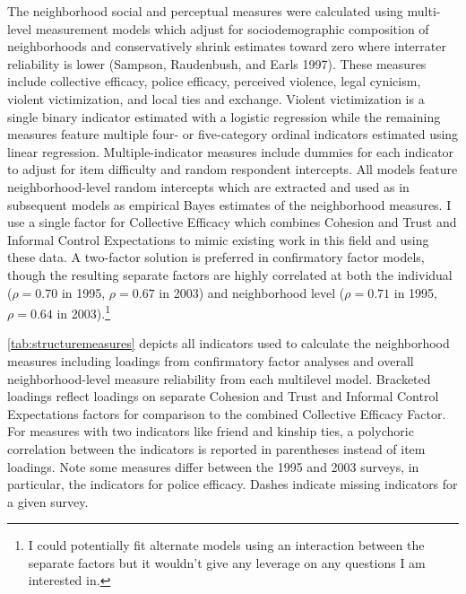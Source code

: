 \documentclass [11pt, proquest] {uwthesis}[2015/03/03]
\begin{document}
The neighborhood social and perceptual measures were calculated using multi-level measurement models which adjust for sociodemographic composition of neighborhoods and conservatively shrink estimates toward zero where interrater reliability is lower (Sampson, Raudenbush, and Earls 1997). These measures include collective efficacy, police efficacy, perceived violence, legal cynicism, violent victimization, and local ties and exchange. Violent victimization is a single binary indicator estimated with a logistic regression while the remaining measures feature multiple four- or five-category ordinal indicators estimated using linear regression. Multiple-indicator measures include dummies for each indicator to adjust for item difficulty and random respondent intercepts. All models feature neighborhood-level random intercepts which are extracted and used as in subsequent models as empirical Bayes estimates of the neighborhood measures. I use a single factor for Collective Efficacy which combines Cohesion and Trust and Informal Control Expectations to mimic existing work in this field and using these data. A two-factor solution is preferred in confirmatory factor models, though the resulting separate factors are highly correlated at both the individual (\(\rho=0.70\) in 1995, \(\rho=0.67\) in 2003) and neighborhood level (\(\rho=0.71\) in 1995, \(\rho=0.64\) in 2003).\footnote{I could potentially fit alternate models using an interaction between the separate factors but it wouldn't give any leverage on any questions I am interested in.}

\ref{tab:structuremeasures} depicts all indicators used to calculate the neighborhood measures including loadings from confirmatory factor analyses and overall neighborhood-level measure reliability from each multilevel model. Bracketed loadings reflect loadings on separate Cohesion and Trust and Informal Control Expectations factors for comparison to the combined Collective Efficacy Factor. For measures with two indicators like friend and kinship ties, a polychoric correlation between the indicators is reported in parentheses instead of item loadings. Note some measures differ between the 1995 and 2003 surveys, in particular, the indicators for police efficacy. Dashes indicate missing indicators for a given survey.

\providecommand{\docline}[3]{\noalign{\global\setlength{\arrayrulewidth}{#1}}\arrayrulecolor[HTML]{#2}\cline{#3}}

\setlength{\tabcolsep}{4pt}
\end{document}
